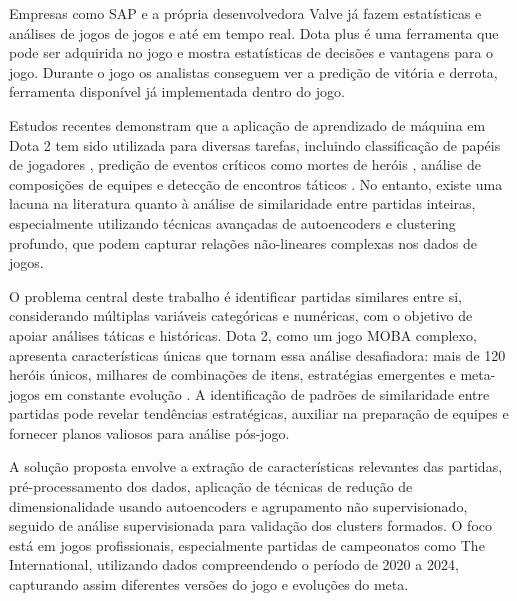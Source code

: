 \documentclass[12pt]{article}
\begin{document}
Empresas como SAP e a própria desenvolvedora Valve já fazem estatísticas e análises de jogos de jogos e até em tempo real. Dota plus é uma ferramenta que pode ser adquirida no jogo e mostra estatísticas de decisões e vantagens para o jogo. Durante o jogo os analistas conseguem ver a predição de vitória e derrota, ferramenta disponível já implementada dentro do jogo.

Estudos recentes demonstram que a aplicação de aprendizado de máquina em Dota 2 tem sido utilizada para diversas tarefas, incluindo classificação de papéis de jogadores \cite{eggert2015classification}, predição de eventos críticos como mortes de heróis \cite{katona2019time}, análise de composições de equipes \cite{cadman2024studying} e detecção de encontros táticos \cite{schubert2016esports}. No entanto, existe uma lacuna na literatura quanto à análise de similaridade entre partidas inteiras, especialmente utilizando técnicas avançadas de autoencoders e clustering profundo, que podem capturar relações não-lineares complexas nos dados de jogos.

O problema central deste trabalho é identificar partidas similares entre si, considerando múltiplas variáveis categóricas e numéricas, com o objetivo de apoiar análises táticas e históricas. Dota 2, como um jogo MOBA complexo, apresenta características únicas que tornam essa análise desafiadora: mais de 120 heróis únicos, milhares de combinações de itens, estratégias emergentes e meta-jogos em constante evolução \cite{Font2019Dota2B}. A identificação de padrões de similaridade entre partidas pode revelar tendências estratégicas, auxiliar na preparação de equipes e fornecer planos valiosos para análise pós-jogo.

A solução proposta envolve a extração de características relevantes das partidas, pré-processamento dos dados, aplicação de técnicas de redução de dimensionalidade usando autoencoders e agrupamento não supervisionado, seguido de análise supervisionada para validação dos clusters formados. O foco está em jogos profissionais, especialmente partidas de campeonatos como The International, utilizando dados compreendendo o período de 2020 a 2024, capturando assim diferentes versões do jogo e evoluções do meta.


\end{document}
